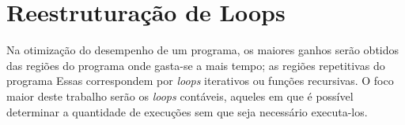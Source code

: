 
\section{Reestruturação de Loops}

Na otimização do desempenho de um programa, os maiores ganhos serão obtidos das 
regiões do programa onde gasta-se a mais tempo; as regiões repetitivas do
programa \cite{Chang:2004}
Essas correspondem por \textit{loops} iterativos ou funções recursivas.
O foco maior deste trabalho serão os \textit{loops} contáveis, aqueles em que é
possível determinar a quantidade de execuções sem que seja necessário
executa-los.


